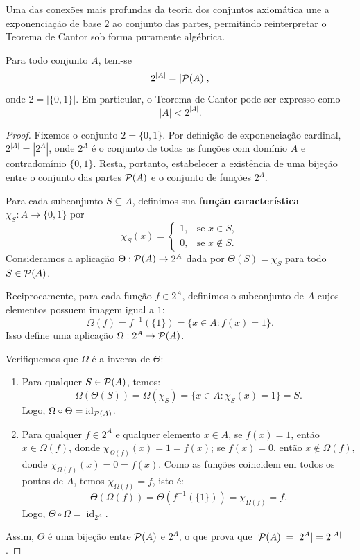 Uma das conexões mais profundas da teoria dos conjuntos axiomática une a exponenciação de base \(2\) ao conjunto das partes, permitindo reinterpretar o Teorema de Cantor sob forma puramente algébrica.

\begin{proposicao}
    Para todo conjunto \(A\), tem-se
    \[
        2^{|A|} = |\mathcal{P}(A)|,
    \]
    onde \(2 = |\{0, 1\}|\). Em particular, o Teorema de Cantor pode ser expresso como
    \[
        |A| < 2^{|A|}.
    \]
\end{proposicao}

\begin{proof}
    Fixemos o conjunto \(2 = \{0, 1\}\). Por definição de exponenciação cardinal, \(2^{|A|} = |2^A|\), onde \(2^A\) é o conjunto de todas as funções com domínio \(A\) e contradomínio \(\{0, 1\}\). Resta, portanto, estabelecer a existência de uma bijeção entre o conjunto das partes \(\mathcal{P}(A)\) e o conjunto de funções \(2^A\).

    Para cada subconjunto \(S \subseteq A\), definimos sua \textbf{função característica} \(\chi_S: A \to \{0, 1\}\) por
    \[
        \chi_S(x) =
        \begin{cases}
            1, & \text{se } x \in S,    \\
            0, & \text{se } x \notin S.
        \end{cases}
    \]
    Consideramos a aplicação \(\Theta: \mathcal{P}(A) \to 2^A\) dada por \(\Theta(S) = \chi_S\) para todo \(S \in \mathcal{P}(A)\).

    Reciprocamente, para cada função \(f \in 2^A\), definimos o subconjunto de \(A\) cujos elementos possuem imagem igual a \(1\):
    \[
        \Omega(f) = f^{-1}(\{1\}) = \{x \in A : f(x) = 1\}.
    \]
    Isso define uma aplicação \(\Omega: 2^A \to \mathcal{P}(A)\).

    Verifiquemos que \(\Omega\) é a inversa de \(\Theta\):
    \begin{enumerate}
        \item Para qualquer \(S \in \mathcal{P}(A)\), temos:
              \[
                  \Omega(\Theta(S)) = \Omega(\chi_S) = \{x \in A : \chi_S(x) = 1\} = S.
              \]
              Logo, \(\Omega \circ \Theta = \operatorname{id}_{\mathcal{P}(A)}\).
        \item Para qualquer \(f \in 2^A\) e qualquer elemento \(x \in A\), se \(f(x) = 1\), então \(x \in \Omega(f)\), donde \(\chi_{\Omega(f)}(x) = 1 = f(x)\); se \(f(x) = 0\), então \(x \notin \Omega(f)\), donde \(\chi_{\Omega(f)}(x) = 0 = f(x)\). Como as funções coincidem em todos os pontos de \(A\), temos \(\chi_{\Omega(f)} = f\), isto é:
              \[
                  \Theta(\Omega(f)) = \Theta(f^{-1}(\{1\})) = \chi_{\Omega(f)} = f.
              \]
              Logo, \(\Theta \circ \Omega = \operatorname{id}_{2^A}\).
    \end{enumerate}
    Assim, \(\Theta\) é uma bijeção entre \(\mathcal{P}(A)\) e \(2^A\), o que prova que \(|\mathcal{P}(A)| = |2^A| = 2^{|A|}\).
\end{proof}

